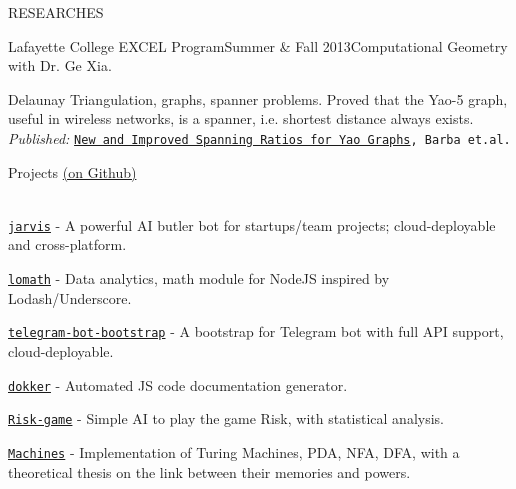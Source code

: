 \documentclass{resume} %
\begin{document}
\begin{rSection}{RESEARCHES}

\begin{rSubsection}{Lafayette College EXCEL Program}{Summer \& Fall 2013}{Computational Geometry with Dr. Ge Xia.}{}
\item Delaunay Triangulation, graphs, spanner problems. Proved that the Yao-5 graph, useful in wireless networks, is a spanner, i.e. shortest distance always exists.\\
{\em Published:} {\tt \href{http://arxiv.org/abs/1307.5829}{\textcolor{Cerulean}{New and Improved Spanning Ratios for Yao Graphs}}, Barba et.al.}
\end{rSubsection}


\end{rSection}



\begin{rSection}{Projects \href{https://github.com/kengz}{(on Github)}}

{\setlength{\parskip}{1.8pt}

\ \\
{\tt \href{https://github.com/kengz/jarvis}{\textcolor{Cerulean}{jarvis}}} - A powerful AI butler bot for startups/team projects; cloud-deployable and cross-platform.

{\tt \href{https://github.com/kengz/lomath}{\textcolor{Cerulean}{lomath}}} - Data analytics, math module for NodeJS inspired by Lodash/Underscore.



{\tt \href{https://github.com/kengz/telegram-bot-bootstrap}{\textcolor{Cerulean}{telegram-bot-bootstrap}}} - A bootstrap for Telegram bot with full API support, cloud-deployable.

{\tt \href{https://github.com/kengz/dokker}{\textcolor{Cerulean}{dokker}}} - Automated JS code documentation generator.

{\tt \href{https://github.com/kengz/Risk-game}{\textcolor{Cerulean}{Risk-game}}} - Simple AI to play the game Risk, with statistical analysis.

{\tt \href{https://github.com/kengz/Machines}{\textcolor{Cerulean}{Machines}}} - Implementation of Turing Machines, PDA, NFA, DFA, with a theoretical thesis on the link between their memories and powers.
}
\end{rSection}
\end{document}
